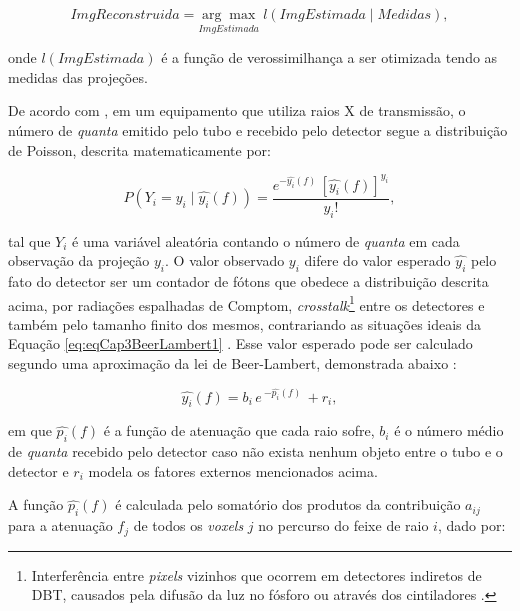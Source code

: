 {{\begin{equation}
ImgReconstruida = \underset{ImgEstimada}{\arg\max} \; l(ImgEstimada \mid Medidas),
\label{eq:eqCap3ModeloVerossimilhança}
\end{equation} 

\noindent onde $l(ImgEstimada)$ é a função de verossimilhança a ser otimizada tendo as medidas das projeções.


De acordo com , em um equipamento que utiliza raios X de transmissão, o número de \textit{quanta} emitido pelo tubo e recebido pelo detector segue a distribuição de Poisson, descrita matematicamente por:

\begin{equation}
P(Y_{i} = y_{i} \mid \hat{y_{i}}(f) ) = \dfrac{e^{-\hat{y_{i}}(f) } \, [\hat{y_{i}}(f)] ^{y_{i}}}  {y_{i}!},
\label{eq:eqCap3DistribuicaoPoisson}
\end{equation}

\noindent tal que $Y_{i}$ é uma variável aleatória contando o número de \textit{quanta} em cada observação da projeção $y_{i}$. O valor observado $y_{i}$ difere do valor esperado $\hat{y_{i}}$ pelo fato do detector ser um contador de fótons que obedece a distribuição descrita acima, por radiações espalhadas de Comptom, \textit{crosstalk}\footnote{Interferência entre \textit{pixels} vizinhos que ocorrem em detectores indiretos de \acs{DBT}, causados pela difusão da luz no fósforo ou através dos cintiladores \cite{zheng2018detector}.} entre os detectores e também pelo tamanho finito dos mesmos, contrariando as situações ideais da Equação \ref{eq:eqCap3BeerLambert1} \cite[p. 6]{Fessler2000handbook}. Esse valor esperado pode ser calculado segundo uma aproximação da lei de Beer-Lambert, demonstrada abaixo \cite[p. 9]{Fessler2000handbook}:

\begin{equation}
\hat{y_{i}}(f) = b_{i} \, e \, ^{-\hat{p_{i}}(f)} \, + r_{i},
\label{eq:eqCap3BeerLambertDiscreto2}
\end{equation}

\noindent em que $\hat{p_{i}}(f)$ é a função de atenuação que cada raio sofre, $b_{i}$ é o número médio de \textit{quanta} recebido pelo detector caso não exista nenhum objeto entre o tubo e o detector e $r_{i}$ modela os fatores externos mencionados acima. 

A função $\hat{p_{i}}(f)$ é calculada pelo somatório dos produtos da contribuição $a_{ij}$ para a atenuação $f_{j}$ de todos os \textit{voxels} $j$ no percurso do feixe de raio $i$, dado por: 


}}
